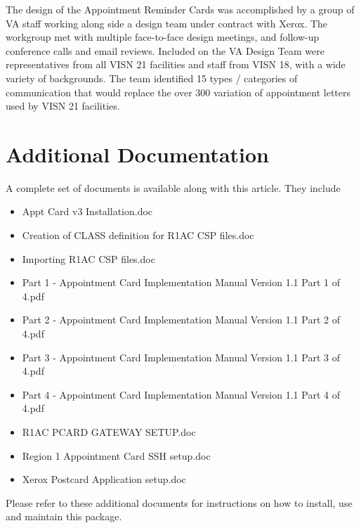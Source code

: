 \documentclass{OSEHRAArticle}
\begin{document}
The design of the Appointment Reminder Cards was accomplished by a group of VA staff working
along side a design team under contract with Xerox. The workgroup met with multiple face-to-face
design meetings, and follow-up conference calls and email reviews. Included on the VA Design Team
were representatives from all VISN 21 facilities and staff from VISN 18, with a wide variety of
backgrounds. The team identified 15 types / categories of communication that would replace the over
300 variation of appointment letters used by VISN 21 facilities.

\section{Additional Documentation}

A complete set of documents is available along with this article. They include

\begin{itemize}
\item Appt Card v3 Installation.doc
\item Creation of CLASS definition for R1AC CSP files.doc
\item Importing  R1AC CSP files.doc
\item Part 1 - Appointment Card Implementation Manual Version 1.1 Part 1 of 4.pdf
\item Part 2 - Appointment Card Implementation Manual Version 1.1 Part 2 of 4.pdf
\item Part 3 - Appointment Card Implementation Manual Version 1.1 Part 3 of 4.pdf
\item Part 4 - Appointment Card Implementation Manual Version 1.1 Part 4 of 4.pdf
\item R1AC PCARD GATEWAY SETUP.doc
\item Region 1 Appointment Card SSH setup.doc
\item Xerox Postcard Application setup.doc
\end{itemize}

Please refer to these additional documents for instructions on how to install, use and maintain this package.

%
%



\end{document}
